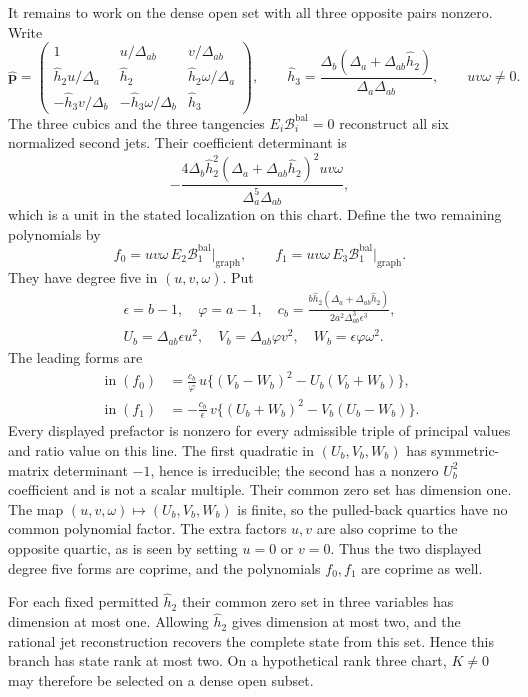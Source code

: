 \documentclass[11pt,a4paper]{article}
\numberwithin{equation}{section}
\theoremstyle{plain}
\theoremstyle{definition}
\theoremstyle{remark}
\begin{document}
It remains to work on the dense open set with all three opposite
pairs nonzero. Write
\[
 \widehat{\boldsymbol p}=
 \begin{pmatrix}
 1&u/\Delta_{ab}&v/\Delta_{ab}\\
 \widehat h_2 u/\Delta_a&\widehat h_2 &\widehat h_2 \omega/\Delta_a\\
 -\widehat h_3 v/\Delta_b&-\widehat h_3 \omega/\Delta_b&\widehat h_3 
 \end{pmatrix},
 \qquad \widehat h_3 =\frac{\Delta_b(\Delta_a+\Delta_{ab}\widehat h_2 )}{\Delta_a\Delta_{ab}},\qquad uv\omega\ne0.
\]
The three cubics and the three tangencies
$E_i\mathcal B_i^{\mathrm{bal}}=0$ reconstruct all six normalized second jets.
Their coefficient determinant is
\[
       -\frac{4\Delta_b\widehat h_2 ^2(\Delta_a+\Delta_{ab}\widehat h_2 )^2uv\omega}{\Delta_a^5\Delta_{ab}},
\]
which is a unit in the stated localization on this chart.
Define the two remaining polynomials by
\[
 f_0=uv\omega\,E_2\mathcal B_1^{\mathrm{bal}}\big|_{\mathrm{graph}},
 \qquad
 f_1=uv\omega\,E_3\mathcal B_1^{\mathrm{bal}}\big|_{\mathrm{graph}}.
\]
They have degree five in $(u,v,\omega)$. Put
\[
 \begin{gathered}
 \epsilon=b-1,\quad\varphi=a-1,\quad
 c_b=\frac{b\widehat h_2 (\Delta_a+\Delta_{ab}\widehat h_2 )}{2a^2\Delta_{ab}^3\epsilon^3},\\
 U_b=\Delta_{ab}\epsilon u^2,\quad V_b=\Delta_{ab}\varphi v^2,\quad
 W_b=\epsilon\varphi\omega^2.
 \end{gathered}
\]
The leading forms are
\begin{align*}
 \operatorname{in}(f_0)
  &=\frac{c_b}{\varphi}\,u
       \{(V_b-W_b)^2-U_b(V_b+W_b)\},\\
 \operatorname{in}(f_1)
  &=-\frac{c_b}{\epsilon}\,v
       \{(U_b+W_b)^2-V_b(U_b-W_b)\}.
\end{align*}
Every displayed prefactor is nonzero for every admissible triple of principal values and
ratio value on this line. The first quadratic in $(U_b,V_b,W_b)$
has symmetric-matrix determinant $-1$, hence is irreducible; the
second has a nonzero $U_b^2$ coefficient and is not a scalar multiple.
Their common zero set has dimension one. The map
$(u,v,\omega)\mapsto(U_b,V_b,W_b)$ is finite, so the pulled-back
quartics have no common polynomial factor. The extra factors $u,v$
are also coprime to the opposite quartic, as is seen by setting
$u=0$ or $v=0$. Thus the two displayed degree five forms are coprime,
and the polynomials $f_0,f_1$ are coprime as well.

For each fixed permitted $\widehat h_2 $ their common zero set in three variables
has dimension at most one. Allowing $\widehat h_2 $ gives dimension at most two,
and the rational jet reconstruction recovers the complete state from this
set. Hence this branch has state rank at
most two. On a hypothetical
rank three chart, $K\ne0$ may therefore be selected on a dense open
subset.
\end{document}
